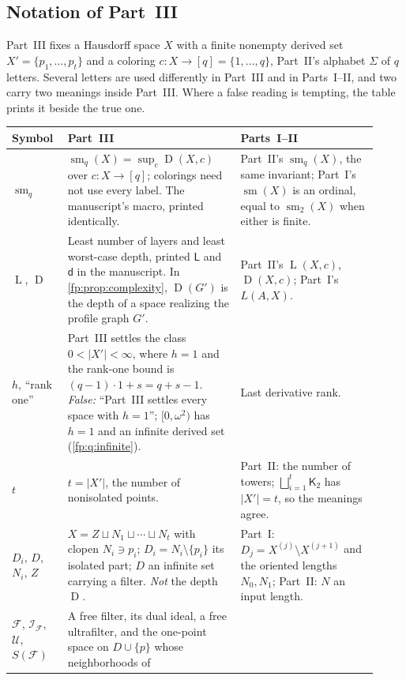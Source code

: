 \documentclass[11pt,letterpaper]{article}
\numberwithin{equation}{section}
\theoremstyle{definition}
\theoremstyle{remark}
\theoremstyle{definition}
\newcommand{\sm}{\operatorname{sm}}
\newcommand{\depth}{\operatorname{D}}
\newcommand{\layers}{\operatorname{L}}
\newcommand{\smq}{\operatorname{sm}_{q}}
\newcommand{\Tw}{\mathsf K}
\newcommand{\F}{\mathcal F}
\newcommand{\U}{\mathcal U}
\newcommand{\I}{\mathcal I}
\newcommand{\sq}{\mathbin{\sqcup}}
\begin{document}
\subsection{Notation of Part~III}
\label{fp:sec:notation}
Part~III fixes a Hausdorff space $X$ with a finite nonempty derived set
$X'=\{p_1,\ldots,p_t\}$ and a coloring $c:X\to[q]=\{1,\ldots,q\}$, Part~II's
alphabet $\Sigma$ of $q$ letters. Several letters are used differently in
Part~III and in Parts~I--II, and two carry two meanings inside Part~III. Where
a false reading is tempting, the table prints it beside the true one.
\begin{center}\small
\begin{longtable}{@{}>{\raggedright\arraybackslash}p{0.13\linewidth}>{\raggedright\arraybackslash}p{0.44\linewidth}>{\raggedright\arraybackslash}p{0.35\linewidth}@{}}
\toprule
Symbol & Part~III & Parts~I--II\\
\midrule
\endhead
$\sm_q$ & $\sm_q(X)=\sup_c\depth(X,c)$ over $c:X\to[q]$; colorings need not
use every label. The manuscript's macro, printed identically. & Part~II's
$\smq(X)$, the same invariant; Part~I's $\sm(X)$ is an ordinal, equal to
$\operatorname{sm}_2(X)$ when either is finite.\\
$\layers$, $\depth$ & Least number of layers and least worst-case depth,
printed $\mathsf L$ and $\mathsf d$ in the manuscript. In
\cref{fp:prop:complexity}, $\depth(G')$ is the depth of a space realizing the
profile graph $G'$. & Part~II's $\layers(X,c)$, $\depth(X,c)$; Part~I's
$L(A,X)$.\\
$h$, ``rank one'' & Part~III settles the class $0<\lvert X'\rvert<\infty$,
where $h=1$ and the rank-one bound is $(q-1)\cdot1+s=q+s-1$. \emph{False:}
``Part~III settles every space with $h=1$''; $[0,\omega^2)$ has $h=1$ and an
infinite derived set (\cref{fp:q:infinite}). & Last derivative rank.\\
$t$ & $t=\lvert X'\rvert$, the number of nonisolated points. & Part~II: the
number of towers; $\bigsqcup_{i=1}^t\Tw_2$ has $\lvert X'\rvert=t$, so the
meanings agree.\\
$D_i$, $D$, $N_i$, $Z$ & $X=Z\sq N_1\sq\cdots\sq N_t$ with clopen
$N_i\ni p_i$; $D_i=N_i\setminus\{p_i\}$ its isolated part; $D$ an infinite
set carrying a filter. \emph{Not} the depth $\depth$. & Part~I:
$D_j=X^{(j)}\setminus X^{(j+1)}$ and the oriented lengths $N_0,N_1$; Part~II:
$N$ an input length.\\
$\F$, $\I_\F$, $\U$, $S(\F)$ & A free filter, its dual ideal, a free
ultrafilter, and the one-point space on $D\cup\{p\}$ whose neighborhoods of

\end{longtable}
\end{center}
\end{document}
